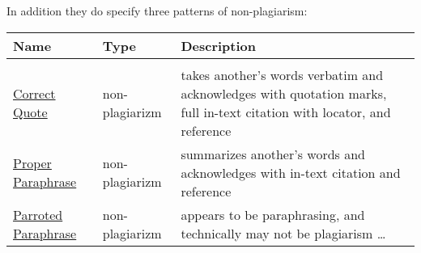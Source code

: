 In addition they do specify  three patterns of
non-plagiarism:

\begin{tabular}{p{4cm}p{4cm}p{6cm}}
Name & Type & Description \\
\toprule
\\
  \href{patternCorrectQuote.html}{Correct Quote} &  non-plagiarizm & takes another's words
  verbatim and acknowledges with quotation marks, full in-text citation
  with locator, and reference
\\
  \href{patternProperParaphrase.html}{Proper Paraphrase} &  non-plagiarizm & summarizes
  another's words and acknowledges with in-text citation and reference
\\
  \href{patternMindlessParaphrase.html}{Parroted Paraphrase} &  non-plagiarizm & appears to
  be paraphrasing, and technically may not be plagiarism \ldots{}
\end{tabular}
